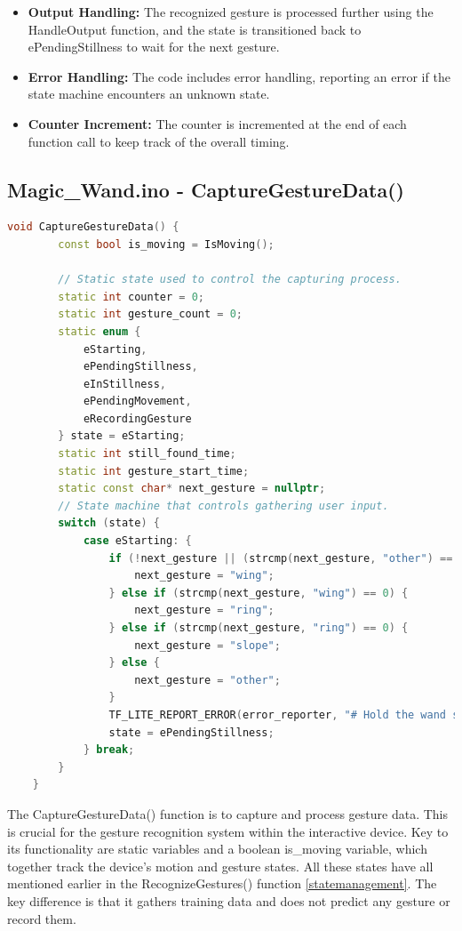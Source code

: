 \begin{itemize}
	\item \textbf{Output Handling:}
	The recognized gesture is processed further using the HandleOutput function, and the state is transitioned back to ePendingStillness to wait for the next gesture.
	
	\item \textbf{Error Handling:}
	The code includes error handling, reporting an error if the state machine encounters an unknown state.
	
	\item \textbf{Counter Increment:}
	The counter is incremented at the end of each function call to keep track of the overall timing.
	
\end{itemize}

\subsection{Magic\_Wand.ino - CaptureGestureData()}
\begin{lstlisting}[language=C++, caption={Gesture Data Capture State Machine in C++}, label={code:capture-gesture-data}, style=bashstyle]
	void CaptureGestureData() {
		const bool is_moving = IsMoving();
		
		// Static state used to control the capturing process.
		static int counter = 0;
		static int gesture_count = 0;
		static enum {
			eStarting,
			ePendingStillness,
			eInStillness,
			ePendingMovement,
			eRecordingGesture
		} state = eStarting;
		static int still_found_time;
		static int gesture_start_time;
		static const char* next_gesture = nullptr;
		// State machine that controls gathering user input.
		switch (state) {
			case eStarting: {
				if (!next_gesture || (strcmp(next_gesture, "other") == 0)) {
					next_gesture = "wing";
				} else if (strcmp(next_gesture, "wing") == 0) {
					next_gesture = "ring";
				} else if (strcmp(next_gesture, "ring") == 0) {
					next_gesture = "slope";
				} else {
					next_gesture = "other";
				}
				TF_LITE_REPORT_ERROR(error_reporter, "# Hold the wand still");
				state = ePendingStillness;
			} break;
		}
	}
\end{lstlisting}

		The CaptureGestureData() function is to capture and process gesture data. This is crucial for the gesture recognition system within the interactive device. Key to its functionality are static variables and a boolean is\_moving variable, which together track the device's motion and gesture states. All these states have all mentioned earlier in the RecognizeGestures() function \ref{statemanagement}. The key difference is that it gathers training data and does not predict any gesture or record them. 
		

